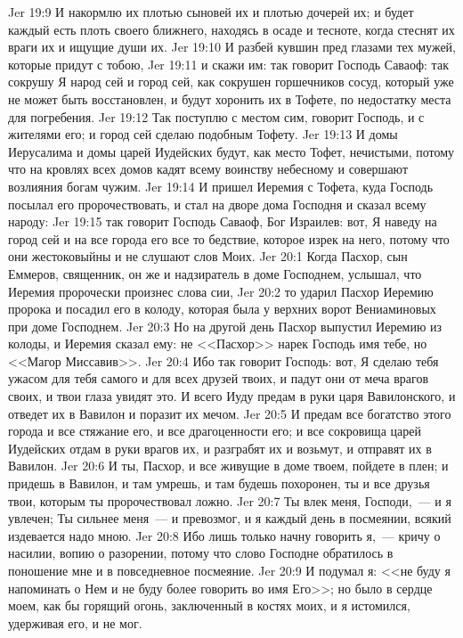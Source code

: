 \vs Jer 19:9 И накормлю их плотью сыновей их и плотью дочерей их; и будет каждый есть плоть своего ближнего, находясь в осаде и тесноте, когда стеснят их враги их и ищущие души их.
\vs Jer 19:10 И разбей кувшин пред глазами тех мужей, которые придут с тобою,
\vs Jer 19:11 и скажи им: так говорит Господь Саваоф: так сокрушу Я народ сей и город сей, как сокрушен горшечников сосуд, который уже не может быть восстановлен, и будут хоронить их в Тофете, по недостатку места для погребения.
\vs Jer 19:12 Так поступлю с местом сим, говорит Господь, и с жителями его; и город сей сделаю подобным Тофету.
\vs Jer 19:13 И домы Иерусалима и домы царей Иудейских будут, как место Тофет, нечистыми, потому что на кровлях всех домов кадят всему воинству небесному и совершают возлияния богам чужим.
\rsbpar\vs Jer 19:14 И пришел Иеремия с Тофета, куда Господь посылал его пророчествовать, и стал на дворе дома Господня и сказал всему народу:
\vs Jer 19:15 так говорит Господь Саваоф, Бог Израилев: вот, Я наведу на город сей и на все города его все то бедствие, которое изрек на него, потому что они жестоковыйны и не слушают слов Моих.
\vs Jer 20:1 Когда Пасхор, сын Еммеров, священник, он же и надзиратель в доме Господнем, услышал, что Иеремия пророчески произнес слова сии,
\vs Jer 20:2 то ударил Пасхор Иеремию пророка и посадил его в колоду, которая была у верхних ворот Вениаминовых при доме Господнем.
\vs Jer 20:3 Но на другой день Пасхор выпустил Иеремию из колоды, и Иеремия сказал ему: не <<Пасхор>> нарек Господь имя тебе, но <<Магор Миссавив>>.
\vs Jer 20:4 Ибо так говорит Господь: вот, Я сделаю тебя ужасом для тебя самого и для всех друзей твоих, и падут они от меча врагов своих, и твои глаза увидят это. И всего Иуду предам в руки царя Вавилонского, и отведет их в Вавилон и поразит их мечом.
\vs Jer 20:5 И предам все богатство этого города и все стяжание его, и все драгоценности его; и все сокровища царей Иудейских отдам в руки врагов их, и разграбят их и возьмут, и отправят их в Вавилон.
\vs Jer 20:6 И ты, Пасхор, и все живущие в доме твоем, пойдете в плен; и придешь в Вавилон, и там умрешь, и там будешь похоронен, ты и все друзья твои, которым ты пророчествовал ложно.
\vs Jer 20:7 Ты влек меня, Господи,~--- и я увлечен; Ты сильнее меня~--- и превозмог, и я каждый день в посмеянии, всякий издевается надо мною.
\vs Jer 20:8 Ибо лишь только начну говорить я,~--- кричу о насилии, вопию о разорении, потому что слово Господне обратилось в поношение мне и в повседневное посмеяние.
\vs Jer 20:9 И подумал я: <<не буду я напоминать о Нем и не буду более говорить во имя Его>>; но было в сердце моем, как бы горящий огонь, заключенный в костях моих, и я истомился, удерживая его, и не мог.
